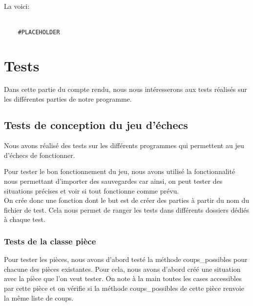 \documentclass{article}
\begin{document}
La voici:
\begin{verbatim}

    #PLACEHOLDER
\end{verbatim}

\section{Tests}
Dans cette partie du compte rendu, nous nous intéresserons aux tests réalisés sur les différentes parties de notre programme.

\subsection{Tests de conception du jeu d'échecs}
Nous avons réalisé des tests sur les différents programmes qui permettent au jeu d'échecs de fonctionner.

Pour tester le bon fonctionnement du jeu, nous avons utilisé la fonctionnalité nous permettant d'importer des sauvegardes car ainsi, on peut tester des situations précises et voir si tout fonctionne comme prévu.
\\
On crée donc une fonction dont le but est de créer des parties à partir du nom du fichier de test. Cela nous permet de ranger les tests dans différents dossiers dédiés à chaque test.

\subsubsection{Tests de la classe pièce}
Pour tester les pièces, nous avons d'abord testé la méthode coups\_possibles pour chacune des pièces existantes. Pour cela, nous avons d'abord créé une situation avec la pièce que l'on veut tester. On note à la main toutes les cases accessibles par cette pièce et on vérifie si la méthode coups\_possibles de cette pièce renvoie la même liste de coups.
\end{document}
